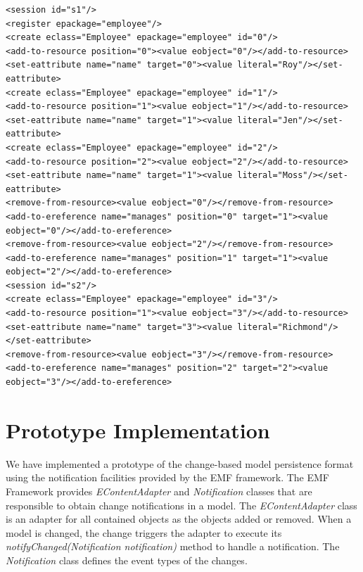 \documentclass{llncs}
\begin{document}
\begin{lstlisting}[style=xml,caption={Change-based representation of the model of Figure \ref{image2}.},label=cbpmodel1]
<session id="s1"/>
<register epackage="employee"/>
<create eclass="Employee" epackage="employee" id="0"/>
<add-to-resource position="0"><value eobject="0"/></add-to-resource>
<set-eattribute name="name" target="0"><value literal="Roy"/></set-eattribute>
<create eclass="Employee" epackage="employee" id="1"/>
<add-to-resource position="1"><value eobject="1"/></add-to-resource>
<set-eattribute name="name" target="1"><value literal="Jen"/></set-eattribute>
<create eclass="Employee" epackage="employee" id="2"/>
<add-to-resource position="2"><value eobject="2"/></add-to-resource>
<set-eattribute name="name" target="1"><value literal="Moss"/></set-eattribute>
<remove-from-resource><value eobject="0"/></remove-from-resource>
<add-to-ereference name="manages" position="0" target="1"><value eobject="0"/></add-to-ereference>
<remove-from-resource><value eobject="2"/></remove-from-resource>
<add-to-ereference name="manages" position="1" target="1"><value eobject="2"/></add-to-ereference>
<session id="s2"/>
<create eclass="Employee" epackage="employee" id="3"/>
<add-to-resource position="1"><value eobject="3"/></add-to-resource>
<set-eattribute name="name" target="3"><value literal="Richmond"/></set-eattribute>
<remove-from-resource><value eobject="3"/></remove-from-resource>
<add-to-ereference name="manages" position="2" target="2"><value eobject="3"/></add-to-ereference>
\end{lstlisting}

\section{Prototype Implementation}
\label{Prototype Implementation}
We have implemented a prototype of the change-based model persistence format using the notification facilities provided by the EMF framework. The EMF Framework provides \emph{EContentAdapter} and \emph{Notification} classes that are responsible to obtain change notifications in a model. The \emph{EContentAdapter} class is an adapter for all contained objects as the objects added or removed. When a model is changed, the change triggers the adapter to execute its \emph{notifyChanged(Notification notification)} method to handle a notification. The \emph{Notification} class defines the event types of the changes.
\end{document}
